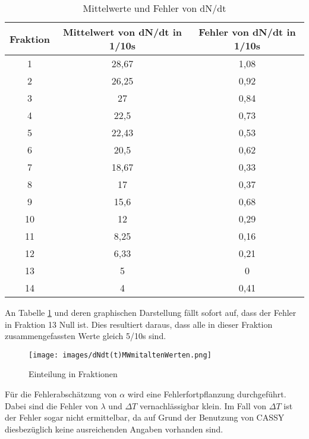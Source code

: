 \begin{table}
\centering
\begin{tabular}{ccc}

Fraktion	&Mittelwert von dN/dt in 1/10s	&Fehler von dN/dt in 1/10s \\
\toprule
1		&28,67				&1,08\\

2		&26,25				&0,92\\

3		&27					&0,84\\

4		&22,5				&0,73\\

5		&22,43				&0,53\\

6		&20,5				&0,62\\

7		&18,67				&0,33\\

8		&17					&0,37\\

9		&15,6				&0,68\\

10		&12					&0,29\\

11		&8,25				&0,16\\

12		&6,33				&0,21\\

13		&5					&0\\

14		&4					&0,41\\

\end{tabular}
\caption{Mittelwerte und Fehler von dN/dt}
\label{tbl_3}
\end{table}


An Tabelle \ref{tbl_3} und deren graphischen Darstellung  fällt sofort auf, dass 
der Fehler in Fraktion 13 Null ist. Dies resultiert daraus, dass alle in dieser Fraktion zusammengefassten Werte 
gleich 5/10s sind. 


\begin{figure}
\centering
        \texttt{[image: images/dNdt(t)MWmitaltenWerten.png]}
\caption{Einteilung in Fraktionen}
\label{dNdt(t)MWmitaltenWerten}
\end{figure}


Für die Fehlerabschätzung von $ \alpha $ wird eine Fehlerfortpflanzung durchgeführt.
Dabei sind die Fehler von $ \lambda $  und  $ \Delta T $ vernachlässigbar klein. Im Fall von $ \Delta T $ ist der Fehler sogar nicht ermittelbar, da auf Grund der Benutzung von CASSY diesbezüglich keine ausreichenden Angaben vorhanden sind.

